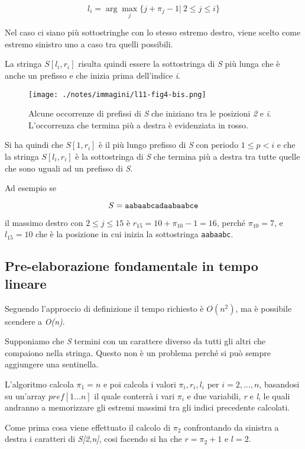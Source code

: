 $$
l_i = \arg\max\limits_{j} \{ j + \pi_j -1 | \: 2 \leq j \leq i\}
$$

Nel caso ci siano più sottostringhe con lo stesso estremo destro, viene scelto come estremo sinistro uno a caso tra quelli possibili.

La stringa $ S[l_i, r_i] $ risulta quindi essere la sottostringa di \textit{S} più lunga che è anche un prefisso e che inizia prima dell'indice \textit{i}.

\begin{figure}[htbp]
	\centering
	\texttt{[image: ./notes/immagini/l11-fig4-bis.png]}
	\caption{Alcune occorrenze di prefissi di \textit{S} che iniziano tra le posizioni \textit{2} e \textit{i}. L'occorrenza che termina più a destra è evidenziata in rosso.}
\end{figure}

Si ha quindi che $ S[1,r_i] $ è il più lungo prefisso di \textit{S} con periodo $ 1 \leq p < i $ e che la stringa $ S[l_i, r_i] $ è la sottostringa di \textit{S} che termina più a destra tra tutte quelle che sono uguali ad un prefisso di \textit{S}.

Ad esempio se 

$$
S = \text{\texttt{aabaabcadaabaabce}}
$$

il massimo destro con $ 2 \leq j \leq 15 $ è $ r_{15} = 10 + \pi_{10} -1 = 16$, perché $ \pi_{10} = 7$, e $ l_{15} = 10 $ che è la posizione in cui inizia la sottostringa \texttt{aabaabc}.

\subsection{Pre-elaborazione fondamentale in tempo lineare}\label{preambolazione-fondamentale-in-tempo-lineare}

Seguendo l'approccio di definizione il tempo richiesto è
$O(n^2)$, ma è possibile scendere a \emph{O(n)}.

Supponiamo che \emph{S} termini con un carattere diverso da tutti gli
altri che compaiono nella stringa. Questo non è un problema perché si
può sempre aggiungere una sentinella.

L'algoritmo calcola $\pi_1 = n$ e poi calcola i valori $\pi_i, r_i, l_i$ per $i = 2,\ldots, n$, basandosi su un'array $ pref[1\ldots n] $ il quale conterrà i vari $ \pi_i $ e due variabili, \textit{r} e \textit{l}, le quali andranno a memorizzare gli estremi massimi tra gli indici precedente calcolati.

Come prima cosa viene effettuato il calcolo di $ \pi_2 $ confrontando da sinistra a destra i caratteri di \textit{S[2,n]}, cosi facendo si ha che $ r = \pi_2 +1 $ e $l = 2$.

